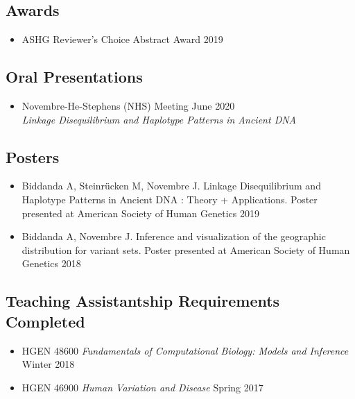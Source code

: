 \documentclass[a4paper, 11pt]{article}
\begin{document}
\newpage
\subsection*{Awards}
\begin{itemize}
    \item ASHG Reviewer's Choice Abstract Award  \hfill 2019 
\end{itemize}

\subsection*{Oral Presentations}
\begin{itemize}
	\item Novembre-He-Stephens (NHS) Meeting \hfill June 2020\\ \emph{Linkage Disequilibrium and Haplotype Patterns in Ancient DNA}   
\end{itemize}

\subsection*{Posters}
\begin{itemize}
	 \item Biddanda A, Steinr\"{u}cken M, Novembre J. Linkage Disequilibrium and Haplotype Patterns in Ancient DNA : Theory + Applications. Poster presented at American Society of Human Genetics 2019
	 \item Biddanda A, Novembre J. Inference and visualization of the geographic distribution for variant sets. Poster presented at American Society of Human Genetics 2018 
\end{itemize}

\subsection*{Teaching Assistantship Requirements Completed}
\begin{itemize}
	\item HGEN 48600 \emph{Fundamentals of Computational Biology: Models and Inference} \hfill Winter 2018\\
	\item HGEN 46900 \emph{Human Variation and Disease} \hfill Spring 2017\\
\end{itemize}
\end{document}
